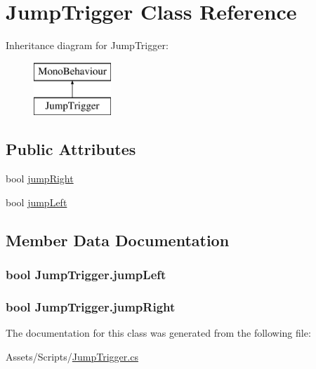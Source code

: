 \hypertarget{class_jump_trigger}{}\section{Jump\+Trigger Class Reference}
\label{class_jump_trigger}
Inheritance diagram for Jump\+Trigger\+:\begin{figure}[H]
\begin{center}
\leavevmode
\includegraphics[height=2.000000cm]{class_jump_trigger}
\end{center}
\end{figure}
\subsection*{Public Attributes}
\begin{DoxyCompactItemize}
\item 
bool \hyperlink{class_jump_trigger_a0252c4670ba9e91c8bedab447ce4fa4d}{jump\+Right}
\item 
bool \hyperlink{class_jump_trigger_a89d218de1f0ee9a030e74129f8b5e22f}{jump\+Left}
\end{DoxyCompactItemize}


\subsection{Member Data Documentation}
\hypertarget{class_jump_trigger_a89d218de1f0ee9a030e74129f8b5e22f}{}
\subsubsection[{jump\+Left}]{\setlength{\rightskip}{0pt plus 5cm}bool Jump\+Trigger.\+jump\+Left}\label{class_jump_trigger_a89d218de1f0ee9a030e74129f8b5e22f}
\hypertarget{class_jump_trigger_a0252c4670ba9e91c8bedab447ce4fa4d}{}
\subsubsection[{jump\+Right}]{\setlength{\rightskip}{0pt plus 5cm}bool Jump\+Trigger.\+jump\+Right}\label{class_jump_trigger_a0252c4670ba9e91c8bedab447ce4fa4d}


The documentation for this class was generated from the following file\+:\begin{DoxyCompactItemize}
\item 
Assets/\+Scripts/\hyperlink{_jump_trigger_8cs}{Jump\+Trigger.\+cs}\end{DoxyCompactItemize}
